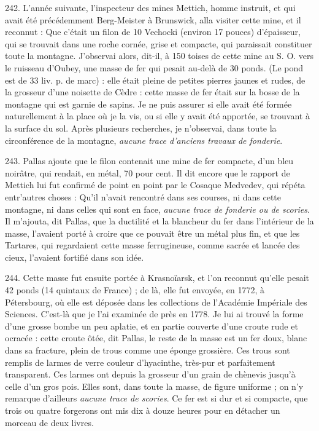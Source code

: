 \documentclass[a4paper, 11pt, oneside, polutonikogreek, french]{article}
\begin{document}
242. L'année suivante, l'inspecteur des mines Mettich, homme instruit, et qui avait été précédemment Berg-Meister à Brunswick, alla visiter cette mine, et il reconnut : \og Que c'était un filon de 10 Vechocki (environ 17 pouces) d'épaisseur, qui se trouvait dans une roche cornée, grise et compacte, qui paraissait constituer toute la montagne. J'observai alors, dit-il, à 150 toises de cette mine au S. O. vers le ruisseau d'Oubey, une masse de fer qui pesait au-delà de 30 ponds. (Le pond est de 33 liv. p. de marc) : elle était pleine de petites pierres jaunes et rudes, de la grosseur d'une noisette de Cèdre : cette masse de fer était sur la bosse de la montagne qui est garnie de sapins. Je ne puis assurer si elle avait été formée naturellement à la place où je la vis, ou si elle y avait été apportée, se trouvant à la surface du sol. Après plusieurs recherches, je n'observai, dans toute la circonférence de la montagne, \emph{aucune trace d'anciens travaux de fonderie}. \fg

243. Pallas ajoute que le filon contenait une mine de fer compacte, d'un bleu noirâtre, qui rendait, en métal, 70 pour cent. Il dit encore que le rapport de Mettich lui fut confirmé de point en point par le Cosaque Medvedev, qui répéta entr'autres choses : \og Qu'il n'avait rencontré dans ses courses, ni dans cette montagne, ni dans celles qui sont en face, \emph{aucune trace de fonderie ou de scories}. Il m'ajouta, dit Pallas, que la ductilité et la blancheur du fer dans l'intérieur de la masse, l'avaient porté à croire que ce pouvait être un métal plus fin, et que les Tartares, qui regardaient cette masse ferrugineuse, comme sacrée et lancée des cieux, l'avaient fortifié dans son idée. \fg

244. Cette masse fut ensuite portée à Krasnoïarsk, et l'on reconnut qu'elle pesait 42 ponds (14 quintaux de France) ; de là, elle fut envoyée, en 1772, à Pétersbourg, où elle est déposée dans les collections de l'Académie Impériale des Sciences. C'est-là que je l'ai examinée de près en 1778. Je lui ai trouvé la forme d'une grosse bombe un peu aplatie, et en partie couverte d'une croute rude et ocracée : \og cette croute ôtée, dit Pallas, le reste de la masse est un fer doux, blanc dans sa fracture, plein de trous comme une éponge grossière. Ces trous sont remplis de larmes de verre couleur d'hyacinthe, très-pur et parfaitement transparent. Ces larmes ont depuis la grosseur d'un grain de chènevis jusqu'à celle d'un gros pois. Elles sont, dans toute la masse, de figure uniforme ; on n'y remarque d'ailleurs \emph{aucune trace de scories}. Ce fer est si dur et si compacte, que trois ou quatre forgerons ont mis dix à douze heures pour en détacher un morceau de deux livres. \fg
\end{document}
